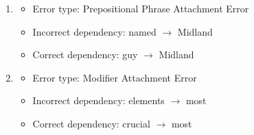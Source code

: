 \documentclass[a4paper]{article}
\begin{document}
\begin{enumerate}[label=(\alph*)]
\begin{enumerate}[label=\roman*.]
            \item
            \begin{itemize}
                \item Error type: Prepositional Phrase Attachment Error
                \item Incorrect dependency: named $\rightarrow$ Midland
                \item Correct dependency: guy $\rightarrow$ Midland
            \end{itemize} 

            \item
            \begin{itemize}
                \item Error type: Modifier Attachment Error
                \item Incorrect dependency: elements $\rightarrow$ most
                \item Correct dependency: crucial $\rightarrow$ most
            \end{itemize} 
        \end{enumerate}   
        
    \end{enumerate}
\end{document}
